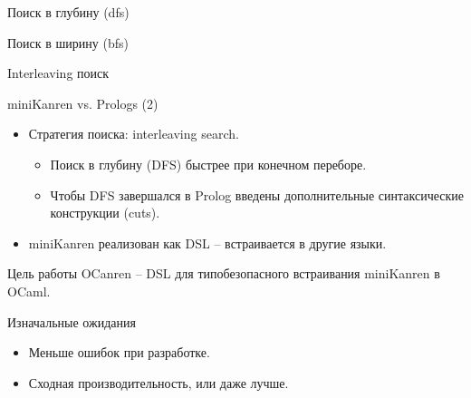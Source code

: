 \documentclass[10pt, mathserif]{beamer}
\theoremstyle{definition}
\begin{document}
\begin{frame}[fragile]{Поиск в глубину (dfs)}
\begin{figure}
\centering
\end{figure}
\end{frame}

\begin{frame}[fragile]{Поиск в ширину (bfs)}
\begin{figure}
\centering
\end{figure}
\end{frame}

\begin{frame}[fragile]{Interleaving поиск}
\begin{figure}
\centering
\end{figure}
\end{frame}

\begin{frame}[fragile]{miniKanren vs. Prologs (2)}
\begin{itemize}
  \item Стратегия поиска: interleaving search.
      \begin{itemize}
	\item Поиск в глубину (DFS) быстрее при конечном переборе.
	\item Чтобы DFS завершался в Prolog введены дополнительные синтаксические конструкции (cuts).
      \end{itemize}
  \item miniKanren реализован как DSL -- встраивается в другие языки.
\end{itemize}
\end{frame}

\begin{frame}[fragile]{Цель работы}
OCanren -- DSL для типобезопасного встраивания miniKanren в OCaml.
\end{frame}

\begin{frame}[fragile]{Изначальные ожидания}
\begin{itemize}
 \item Меньше ошибок при разработке.
 \item Сходная производительность, или даже лучше.
\end{itemize}

\end{frame}
\end{document}

